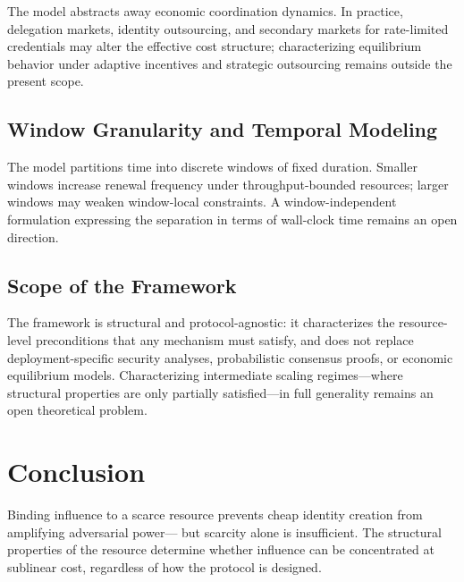 \documentclass[10pt,journal,compsoc]{IEEEtran}
\theoremstyle{remark}
\begin{document}
	The model abstracts away economic coordination dynamics.
	In practice, delegation markets, identity outsourcing,
	and secondary markets for rate-limited credentials may
	alter the effective cost structure; characterizing
	equilibrium behavior under adaptive incentives and
	strategic outsourcing remains outside the present scope.
	
	\subsection{Window Granularity and Temporal Modeling}
	\label{ssec:lim_windows}
	
	The model partitions time into discrete windows of
	fixed duration.
	Smaller windows increase renewal frequency under
	throughput-bounded resources; larger windows may weaken
	window-local constraints.
	A window-independent formulation expressing the
	separation in terms of wall-clock time remains an
	open direction.
	
	\subsection{Scope of the Framework}
	\label{ssec:lim_scope}
	
	The framework is structural and protocol-agnostic:
	it characterizes the resource-level preconditions
	that any mechanism must satisfy, and does not replace
	deployment-specific security analyses, probabilistic
	consensus proofs, or economic equilibrium models.
	Characterizing intermediate scaling regimes---where
	structural properties are only partially satisfied---in
	full generality remains an open theoretical problem.
	
	
	\section{Conclusion}
	\label{sec:conclusion}
	
	Binding influence to a scarce resource prevents cheap
	identity creation from amplifying adversarial power---
	but scarcity alone is insufficient.
	The structural properties of the resource determine
	whether influence can be concentrated at sublinear
	cost, regardless of how the protocol is designed.
	
\end{document}
